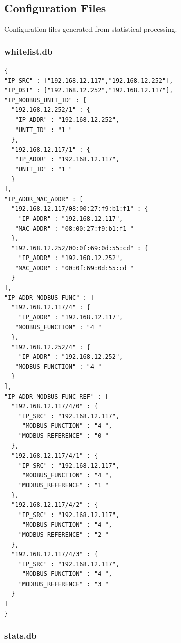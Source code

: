 \documentclass[11pt,]{article}
\begin{document}
\subsection*{Configuration Files}\label{configuration-files}

Configuration files generated from statistical processing.

\subsubsection*{whitelist.db}\label{whitelist.db}

\begin{verbatim}
{
"IP_SRC" : ["192.168.12.117","192.168.12.252"],
"IP_DST" : ["192.168.12.252","192.168.12.117"],
"IP_MODBUS_UNIT_ID" : [
  "192.168.12.252/1" : {
   "IP_ADDR" : "192.168.12.252",
   "UNIT_ID" : "1 "
  },
  "192.168.12.117/1" : {
   "IP_ADDR" : "192.168.12.117",
   "UNIT_ID" : "1 "
  }
],
"IP_ADDR_MAC_ADDR" : [
  "192.168.12.117/08:00:27:f9:b1:f1" : {
    "IP_ADDR" : "192.168.12.117",
   "MAC_ADDR" : "08:00:27:f9:b1:f1 "
  },
  "192.168.12.252/00:0f:69:0d:55:cd" : {
    "IP_ADDR" : "192.168.12.252",
   "MAC_ADDR" : "00:0f:69:0d:55:cd "
  }
],
"IP_ADDR_MODBUS_FUNC" : [
  "192.168.12.117/4" : {
    "IP_ADDR" : "192.168.12.117",
   "MODBUS_FUNCTION" : "4 "
  },
  "192.168.12.252/4" : {
    "IP_ADDR" : "192.168.12.252",
   "MODBUS_FUNCTION" : "4 "
  }
],
"IP_ADDR_MODBUS_FUNC_REF" : [
  "192.168.12.117/4/0" : {
    "IP_SRC" : "192.168.12.117",
     "MODBUS_FUNCTION" : "4 ",
    "MODBUS_REFERENCE" : "0 "
  },
  "192.168.12.117/4/1" : {
    "IP_SRC" : "192.168.12.117",
     "MODBUS_FUNCTION" : "4 ",
    "MODBUS_REFERENCE" : "1 "
  },
  "192.168.12.117/4/2" : {
    "IP_SRC" : "192.168.12.117",
     "MODBUS_FUNCTION" : "4 ",
    "MODBUS_REFERENCE" : "2 "
  },
  "192.168.12.117/4/3" : {
    "IP_SRC" : "192.168.12.117",
     "MODBUS_FUNCTION" : "4 ",
    "MODBUS_REFERENCE" : "3 "
  }
]
}
\end{verbatim}

\newpage

\subsubsection*{stats.db}\label{stats.db}
\end{document}
